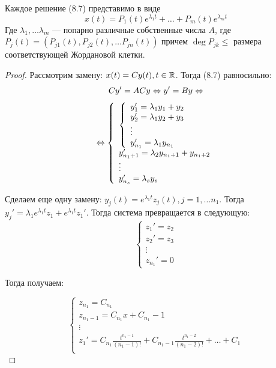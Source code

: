 \begin{theorem}
    Каждое решение (8.7) представимо в виде
    \begin{equation}
        x(t) = P_1(t)e^{\lambda_1t} + \dots + P_m(t)e^{\lambda_mt}
    \end{equation}
    Где \(\lambda_1, \dots \lambda_m\) --- попарно различные собственные числа \(A\), где \(P_j(t) = (P_{j1}(t), P_{j2}(t), \dots P_{jn}(t))\) причем \(\deg P_{jk} \le \) размера соответствующей Жордановой клетки.
\end{theorem}
\begin{proof}
    Рассмотрим замену: \(x(t) = Cy(t), t \in \mathbb{R}\). Тогда (8.7) равносильно:
    \[Cy' = ACy \Leftrightarrow y' = By \Leftrightarrow \]
    \[\Leftrightarrow \left\{\begin{array}{l}
        \left\{
            \begin{array}{l}
                y_1' = \lambda_1y_1 + y_2 \\
                y_2' = \lambda_1y_2 + y_3 \\
                \vdots \\
                y_{n_1}' = \lambda_1y_{n_1} \\
            \end{array}
        \right.\\
        y'_{n_1 + 1} = \lambda_2y_{n_1 + 1} + y_{n_1 + 2} \\
        \vdots \\
        y'_{n_s} = \lambda_s y_s
    \end{array}\right.\]

    Сделаем еще одну замену: \(y_j(t) = e^{\lambda_1 t}z_j(t), j = 1, \dots n_1\). Тогда \(y_j' = \lambda_1e^{\lambda_1 t}z_1 + e^{\lambda_1 t}z_1'\). Тогда система превращается в следующую:
    \begin{equation*}
        \begin{cases*}
            z_1' = z_2 \\
            z_2' = z_3 \\
            \vdots \\
            z_{n_1}' = 0
        \end{cases*}
    \end{equation*}

    Тогда получаем:

    \begin{equation*}
        \begin{cases*}
            z_{n_1} = C_{n_1} \\
            z_{n_1 - 1} = C_{n_1}x + C_{n_1} - 1 \\
            \vdots \\
            z_1' = C_{n_1}\frac{t^{n_1 - 1}}{(n_1 - 1)!} +  C_{n_1 - 1}\frac{t^{n_1 - 2}}{(n_1 - 2)!} + \dots + C_1\\
        \end{cases*}
    \end{equation*}


\end{proof}
